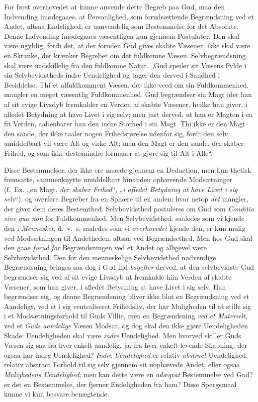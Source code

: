 \documentclass[12pt,a4paper]{book}
\newcommand{\opage}[1]{\marginnote{\footnotesize\textit{[#1]}}}
\begin{document}
For først overhovedet at kunne anvende dette Begreb paa Gud, maa den Indvending
imødegaaes, at Personlighed, \opage{67}som forudsættende Begrændsning ved et Andet, altsaa
Endelighed, er uanvendelig som Bestemmelse for det Absolute. Denne Indvending
imødegaaes væsentligen kun gjennem Postulater. Den skal være ugyldig, fordi det, at
der foruden Gud gives skabte Væsener, ikke skal være en Skranke, der krænker
Begrebet om det fuldkomne Væsen. Selvbegrændsning skal være uadskillelig fra den
fuldkomne Natur. „Gud speiler sit Væsens Fylde i sin Selvbevidstheds indre
Uendelighed og tager den derved i Sandhed i Besiddelse. Thi et alfuldkomment Væsen,
der ikke veed om sin Fuldkommenhed, mangler en meget væsentlig Fuldkommenhed. Gud
begrændser sin Magt idet han af sit evige Livsdyb fremkalder en Verden af skabte
Væsener, hvilke han giver, i afledet Betydning at have Livet i sig selv; men just
derved, at han er Magten i en fri Verden, aabenbarer han den indre Storhed i sin
Magt. Thi ikke er den Magt den sande, der ikke taaler nogen Frihedsrørelse udenfor
sig, fordi den selv umiddelbart vil være Alt og virke Alt; men den Magt er den
sande, der skaber Frihed, og som ikke destomindre formaaer at gjøre sig til Alt i
Alle“.

Disse Bestemmelser, der ikke ere naaede gjennem en Deduction, men kun thetisk
fremsatte, sammenknytte umiddelbart hinanden ophævende Modsætninger (f.\ Ex. „en Magt, \emph{der skaber Frihed}“, „\emph{i afledet Betydning at have Livet i sig selv}“), og
overføre Begreber fra en Sphære til en anden; hvor netop \emph{det} mangler, der giver dem
deres Bestemthed. Selvbevidsthed postuleres om Gud som \textit{Conditio sine qua
non} for Fuldkommenhed. Men Selvbevidsthed, saaledes som vi kjende den i
\emph{Mennesket}, d.\ v.\ s. saaledes som vi \emph{overhovedet} kjende den, er kun mulig
ved Modsætningen til Andetheden, altsaa ved Begrændsethed. Men hos Gud skal den gaae \emph{forud for} Begrændsningen ved et Andet og alligevel være Selvbevidsthed. Den for den
menneskelige Selvbevidsthed nødvendige Begrændsning bringes saa dog i Gud ind
\emph{bagefter} derved, at den selvbevidste Gud begrændser sig ved af sit evige
Livsdyb at fremkalde hiin Verden af skabte Væsener, som han giver, i \opage{68}afledet
Betydning at have Livet i sig selv. Han begrændser sig, og denne Begrændsning
bliver ikke blot en Begrændsning ved et Aandeligt, ved et i sig centraliseret
Frihedsliv, der har Muligheden til at stille sig i et Modsætningsforhold til Guds
Villie, men en Begrændsning \emph{ved et Materielt}, ved et \emph{Guds aandelige} Væsen Modsat, og
dog skal den ikke gjøre Uendeligheden Skade: Uendeligheden skal være \emph{indre}
Uendelighed. Men hvorved skiller Guds Væsen sig saa fra hver enkelt aandelig, ja,
fra hver enkelt levende Skabning, der ogsaa har indre Uendelighed? \emph{Indre Uendelighed} er relativ \emph{abstract} Uendelighed, relativ abstract Forhold til sig selv
gjennem sit uophævede Andet, eller ogsaa \emph{Mulighedens Uendelighed}; men kan dette være
en \emph{adæqvat} Bestemmelse ved Gud? er det en Bestemmelse, der fjerner Endeligheden fra
ham? Disse Spørgsmaal kunne vi kun besvare benægtende.
\end{document}

